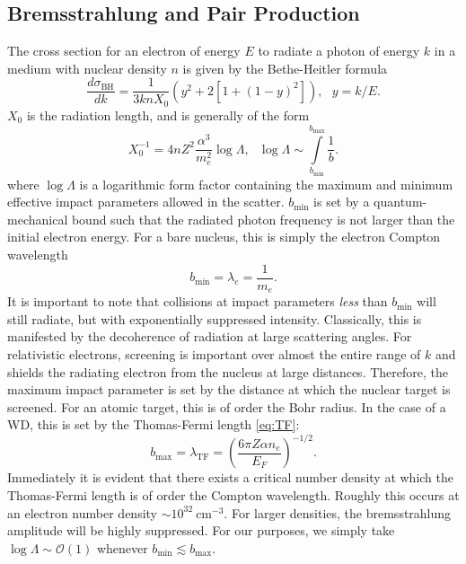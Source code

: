 \documentclass[twocolumn,showpacs,preprintnumbers,amsmath,amssymb,prd]{revtex4}
\newcommand{\OO}{\mathcal{O}}
\def\r{\right)}
\def\l{\left(}
\begin{document}
\begin{appendices}
\subsection*{Bremsstrahlung and Pair Production}
The cross section for an electron of energy $E$ to radiate a photon of energy $k$ in a medium with nuclear density $n$ is given by the Bethe-Heitler formula
\begin{equation}
\label{eq:BH}
\frac{d \sigma_\text{BH}}{dk} = \frac{1}{3 k n X_0} (y^2+2 [1+ (1-y)^2]), ~~~ y = k/E.
\end{equation}
$X_0$ is the radiation length, and is generally of the form 
\begin{equation}
X_0^{-1} = 4 n Z^2 \frac{\alpha^3}{m_e^2} \log{\Lambda}, ~~~ \log{\Lambda} \sim \int \limits_{b_\text{min}}^{b_\text{max}} \frac{1}{b}. 
\end{equation}
where $\log{\Lambda}$ is a logarithmic form factor containing the maximum and minimum effective impact parameters allowed in the scatter. $b_\text{min}$ is set by a quantum-mechanical bound such that the radiated photon frequency is not larger than the initial electron energy. For a bare nucleus, this is simply the electron Compton wavelength 
\begin{equation}
b_\text{min} = \lambda_e = \frac{1}{m_e}. 
\end{equation}
It is important to note that collisions at impact parameters \emph{less} than $b_\text{min}$ will still radiate, but with exponentially suppressed intensity. Classically, this is manifested by the decoherence of radiation at large scattering angles. For relativistic electrons, screening is important over almost the entire range of $k$ and shields the radiating electron from the nucleus at large distances. Therefore, the maximum impact parameter is set by the distance at which the nuclear target is screened. For an atomic target, this is of order the Bohr radius. In the case of a WD, this is set by the Thomas-Fermi length \eqref{eq:TF}:
\begin{equation}
b_\text{max} = \lambda_\text{TF} = \l \frac{6 \pi Z \alpha n_e}{E_F}\r^{-1/2}.
\end{equation}
Immediately it is evident that there exists a critical number density at which the Thomas-Fermi length is of order the Compton wavelength. Roughly this occurs at an electron number density $\sim 10^{32} ~\text{cm}^{-3}$. For larger densities, the bremsstrahlung amplitude will be highly suppressed. For our purposes, we simply take $\log{\Lambda} \sim \OO(1)$ whenever $b_\text{min} \lesssim b_\text{max}$. 


\end{appendices}
\end{document}
